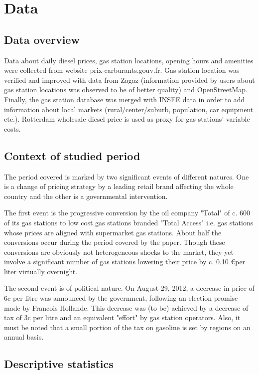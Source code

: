 \documentclass[11pt]{article}
\begin{document}
\section{Data}

\subsection{Data overview}

Data about daily diesel prices, gas station locations, opening hours and amenities were collected from website prix-carburants.gouv.fr. Gas station location was verified and improved with data from Zagaz (information provided by users about gas station locations was observed to be of better quality) and OpenStreetMap. Finally, the gas station database was merged with INSEE data in order to add information about local markets (rural/center/suburb, population, car equipment etc.). Rotterdam wholesale diesel price is used as proxy for gas stations' variable costs.

\subsection{Context of studied period}

The period covered is marked by two significant events of different natures. One is a change of pricing strategy by a leading retail brand affecting the whole country and the other is a governmental intervention.

The first event is the progressive conversion by the oil company "Total" of c. 600 of its gas stations to low cost gas stations branded "Total Access" i.e. gas stations whose prices are aligned with supermarket gas stations. About half the conversions occur during the period covered by the paper. Though these conversions are obviously not heterogeneous shocks to the market, they yet involve a significant number of gas stations lowering their price by c. 0.10 \euro per liter virtually overnight.

The second event is of political nature. On August 29, 2012, a decrease in price of 6c per litre was announced by the government, following an election promise made by Francois Hollande. This decrease was (to be) achieved by a decrease of tax of 3c per litre and an equivalent "effort" by gas station operators. Also, it must be noted that a small portion of the tax on gasoline is set by regions on an annual basis.

\subsection{Descriptive statistics}
\end{document}
